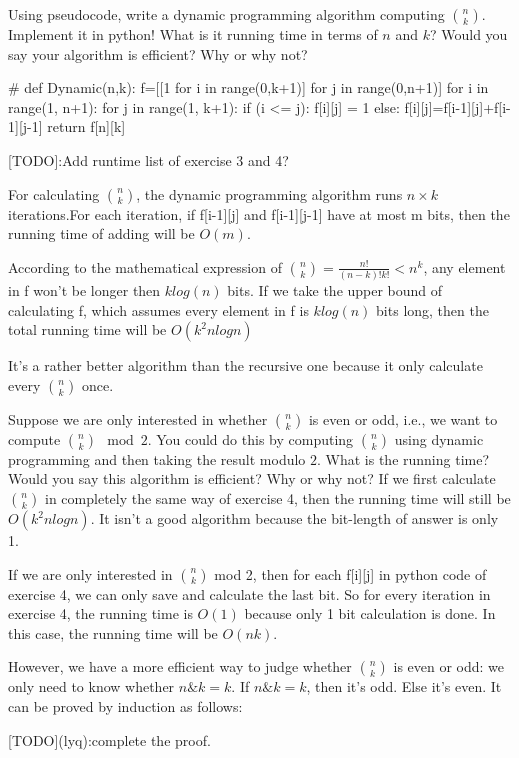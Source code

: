\documentclass[11pt,a4paper,oneside]{article}
\begin{document}
\begin{problem}{4}
    Using pseudocode, write a dynamic programming algorithm
    computing ${n \choose k}$. Implement it in python! What is it running time
    in terms of $n$ and $k$?
    Would you say your algorithm is efficient? Why or why not?
    \solution
    \begin{python}
#
def Dynamic(n,k):
    f=[[1 for i in range(0,k+1)] for j in range(0,n+1)]
    for i in range(1, n+1):
        for j in range(1, k+1):
            if (i <= j):
                f[i][j] = 1
            else:
                f[i][j]=f[i-1][j]+f[i-1][j-1]
    return f[n][k]
    \end{python}

    [TODO]:Add runtime list of exercise 3 and 4?

    For calculating ${n \choose k}$, the dynamic programming algorithm runs $n \times k$ iterations.For each iteration, if f[i-1][j] and f[i-1][j-1] have at most m bits, then the running time of adding will be $O(m)$.

    According to the mathematical expression of ${n \choose k}=\frac{n!}{(n-k)!k!}<n^k$, any element in f won't be longer then $klog(n)$ bits. If we take the upper bound of calculating f, which assumes every element in f is $klog(n)$ bits long, then the total running time will be $O(k^2nlogn)$

    It's a rather better algorithm than the recursive one because it only calculate every ${n \choose k}$ once.

\end{problem}

\begin{problem}{5}
    \statement
    Suppose we are only interested in whether ${n \choose k}$ is even or odd,
  i.e., we want to compute ${n \choose k}  \mod 2$. You could do this by computing 
  ${n \choose k}$ using dynamic programming and then taking
  the result modulo $2$. What is the running time? Would you say this algorithm
  is efficient? Why or why not?
  \solution
If we first calculate ${n \choose k}$ in completely the same way of exercise 4, then the running time will still be $O(k^2nlogn)$. It isn't a good algorithm because the bit-length of answer is only 1.
 
If we are only interested in ${n \choose k}$ mod 2, then for each f[i][j] in python code of exercise 4, we can only save and calculate the last bit. So for every iteration in exercise 4, the running time is $O(1)$ because only 1 bit calculation is done. In this case, the running time will be $O(nk)$.

However, we have a more efficient way to judge whether ${n \choose k}$ is even or odd: we only need to know whether $n \& k = k$. If $n \& k = k$, then it's odd. Else it's even. It can be proved by induction as follows:

[TODO](lyq):complete the proof.
\end{problem}
\end{document}
